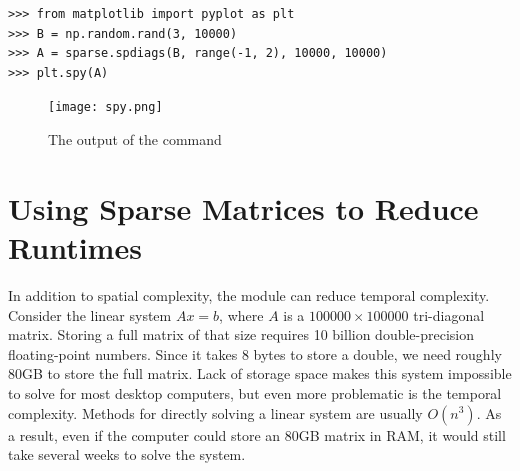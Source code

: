 \begin{lstlisting}
>>> from matplotlib import pyplot as plt
>>> B = np.random.rand(3, 10000)
>>> A = sparse.spdiags(B, range(-1, 2), 10000, 10000)
>>> plt.spy(A)
\end{lstlisting}

\begin{figure}
\centering
\texttt{[image: spy.png]}
\caption{The output of the  command}
\label{fig:mpl_spy}
\end{figure}

\section*{Using Sparse Matrices to Reduce Runtimes}
In addition to spatial complexity, the  module can reduce temporal complexity. 
Consider the linear system $A x = b$, where $A$ is a $100000\times 100000$ tri-diagonal matrix.
Storing a full matrix of that size requires 10 billion double-precision floating-point numbers. 
Since it takes 8 bytes to store a double, we need roughly 80GB to store the full matrix. 
Lack of storage space makes this system impossible to solve for most desktop computers, but even more problematic is the temporal complexity. 
Methods for directly solving a linear system are usually $O(n^3)$. 
As a result, even if the computer could store an 80GB matrix in RAM, it would still take several weeks to solve the system. 

